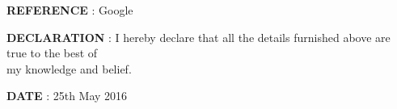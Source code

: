 \documentclass{article}
\begin{document}
 \begin{flushleft}
 	\vspace{0.2in}
 	\textbf{REFERENCE} \hspace{0.30in} : Google
 \end{flushleft}
 
 \begin{flushleft}
 	\vspace{0.2in}
 	\textbf{DECLARATION} \hspace{0.30in} : I hereby declare that all the details furnished above are true to the best of\\ 
 	\hspace{1.6in} my knowledge and belief.
 \end{flushleft}
 
 
 \begin{flushleft}
 	\vspace{0.2in}
 	\textbf{DATE} \hspace{1.05in} : 25th May 2016
 \end{flushleft}
\end{document}
